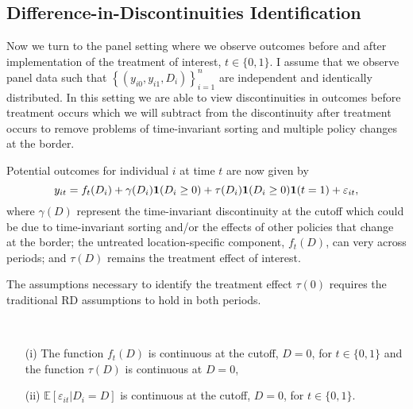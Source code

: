 \documentclass[12pt]{article}
\begin{document}
\subsection{Difference-in-Discontinuities Identification}

Now we turn to the panel setting where we observe outcomes before and after implementation of the treatment of interest, $t \in \{0,1\}$. I assume that we observe panel data such that $\left\{ (y_{i0}, y_{i1}, D_i) \right\}_{i=1}^n$ are independent and identically distributed. In this setting we are able to view discontinuities in outcomes before treatment occurs which we will subtract from the discontinuity after treatment occurs to remove problems of time-invariant sorting and multiple policy changes at the border. 

Potential outcomes for individual $i$ at time $t$ are now given by 
\begin{equation}\label{eq:panel_model}
    y_{it} = f_t(D_i) + \gamma(D_i) \mathbf{1}(D_i \geq 0) + \tau(D_i) \mathbf{1}(D_i \geq 0) \mathbf{1}(t = 1) + \varepsilon_{it},
\end{equation}
where $\gamma(D)$ represent the time-invariant discontinuity at the cutoff which could be due to time-invariant sorting and/or the effects of other policies that change at the border; the untreated location-specific component, $f_t(D)$, can very across periods; and $\tau(D)$ remains the treatment effect of interest. 

The assumptions necessary to identify the treatment effect $\tau(0)$ requires the traditional RD assumptions to hold in both periods.

\begin{assumption}\label{eq:continuity_panel}\ \\\vspace{-10mm} 
    \begin{itemize}
        \item[(i)] The function $f_t(D)$ is continuous at the cutoff, $D = 0$, for $t \in \{0,1\}$ and the function $\tau(D)$ is continuous at $D = 0$, 
        \item[(ii)] $\mathbb{E}\left[ \varepsilon_{it} \vert D_i = D \right]$ is continuous at the cutoff, $D = 0$, for $t \in \{0, 1\}$. 
    \end{itemize}
\end{assumption}
\end{document}
